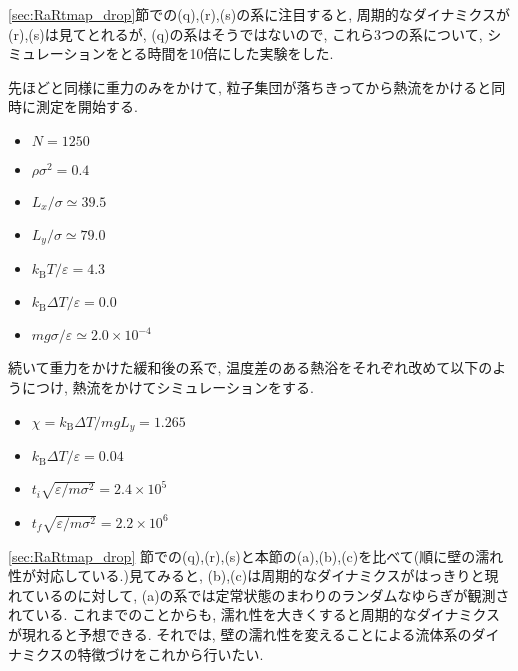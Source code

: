 \ref{sec:RaRtmap_drop}節での(q),(r),(s)の系に注目すると, 周期的なダイナミクスが(r),(s)は見てとれるが, (q)の系はそうではないので, これら3つの系について, シミュレーションをとる時間を10倍にした実験をした. 

先ほどと同様に重力のみをかけて, 粒子集団が落ちきってから熱流をかけると同時に測定を開始する.

\begin{itemize}
  \item $N = 1250$
  \item $\rho \sigma^2 = 0.4$
  \item $L_x / \sigma \simeq 39.5$
  \item $L_y / \sigma \simeq 79.0$
  \item $k_{\text{B}} T/\varepsilon = 4.3$
  \item $k_{\text{B}} \Delta T/\varepsilon = 0.0$
  \item $mg\sigma/\varepsilon \simeq 2.0 \times 10^{-4}$
\end{itemize}

続いて重力をかけた緩和後の系で, 温度差のある熱浴をそれぞれ改めて以下のようにつけ, 熱流をかけてシミュレーションをする. 

\begin{itemize}
  \item $\chi = k_{\text{B}}\Delta T / mg L_y = 1.265$
  \item $k_{\text{B}} \Delta T/\varepsilon = 0.04$
  \item $t_i \sqrt{\varepsilon / m \sigma^2} = 2.4 \times 10^{5}$
  \item $t_f \sqrt{\varepsilon / m \sigma^2} = 2.2 \times 10^{6}$
\end{itemize}

\ref{sec:RaRtmap_drop} 節での(q),(r),(s)と本節の(a),(b),(c)を比べて(順に壁の濡れ性が対応している.)見てみると, (b),(c)は周期的なダイナミクスがはっきりと現れているのに対して, (a)の系では定常状態のまわりのランダムなゆらぎが観測されている. これまでのことからも, 濡れ性を大きくすると周期的なダイナミクスが現れると予想できる. それでは, 壁の濡れ性を変えることによる流体系のダイナミクスの特徴づけをこれから行いたい. 

